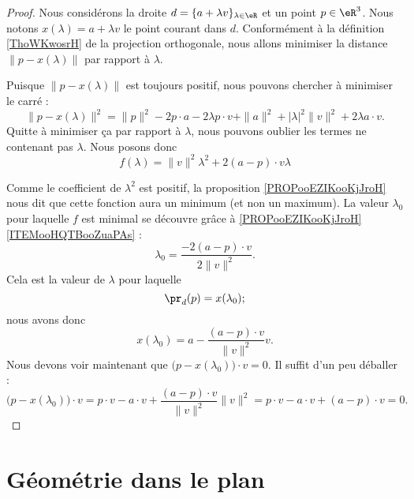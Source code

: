 \begin{proof}
	Nous considérons la droite \( d=\{ a+\lambda v \}_{\lambda\in \eR}\) et un point \( p\in \eR^3\). Nous notons \( x(\lambda)=a+\lambda v\) le point courant dans \( d\). Conformément à la définition \ref{ThoWKwosrH} de la projection orthogonale, nous allons minimiser la distance \( \| p-x(\lambda) \|\) par rapport à \( \lambda\).

	Puisque \( \| p-x(\lambda) \|\) est toujours positif, nous pouvons chercher à minimiser le carré :
	\begin{equation}
		\| p- x(\lambda) \|^2=\| p \|^2-2p\cdot a-2\lambda p\cdot v+\| a \|^2+| \lambda |^2\| v \|^2+2\lambda a\cdot v.
	\end{equation}
	Quitte à minimiser ça par rapport à \( \lambda\), nous pouvons oublier les termes ne contenant pas \( \lambda\). Nous posons donc
	\begin{equation}
		f(\lambda)=\| v \|^2\lambda^2+ 2(a-p)\cdot v\lambda
	\end{equation}

	Comme le coefficient de \( \lambda^2\) est positif, la proposition \ref{PROPooEZIKooKjJroH} nous dit que cette fonction aura un minimum (et non un maximum). La valeur \( \lambda_0\) pour laquelle \( f\) est minimal se découvre grâce à \ref{PROPooEZIKooKjJroH}\ref{ITEMooHQTBooZuaPAs} :
	\begin{equation}
		\lambda_0=\frac{ -2(a-p)\cdot v }{ 2\| v \|^2 }.
	\end{equation}
	Cela est la valeur de \( \lambda\) pour laquelle
	\begin{equation}
		\pr_d(p)=x(\lambda_0);
	\end{equation}
	nous avons donc
	\begin{equation}
		x(\lambda_0)=a-\frac{ (a-p)\cdot v }{ \| v \|^2 }v.
	\end{equation}
	Nous devons voir maintenant que \( \big( p-x(\lambda_0) \big)\cdot v=0\). Il suffit d'un peu déballer :
	\begin{equation}
		\big( p-x(\lambda_0) \big)\cdot v=p\cdot v-a\cdot v+\frac{ (a-p)\cdot v }{ \| v \|^2 }\| v \|^2=p\cdot v-a\cdot v+(a-p)\cdot v=0.
	\end{equation}
\end{proof}



\section{Géométrie dans le plan}

